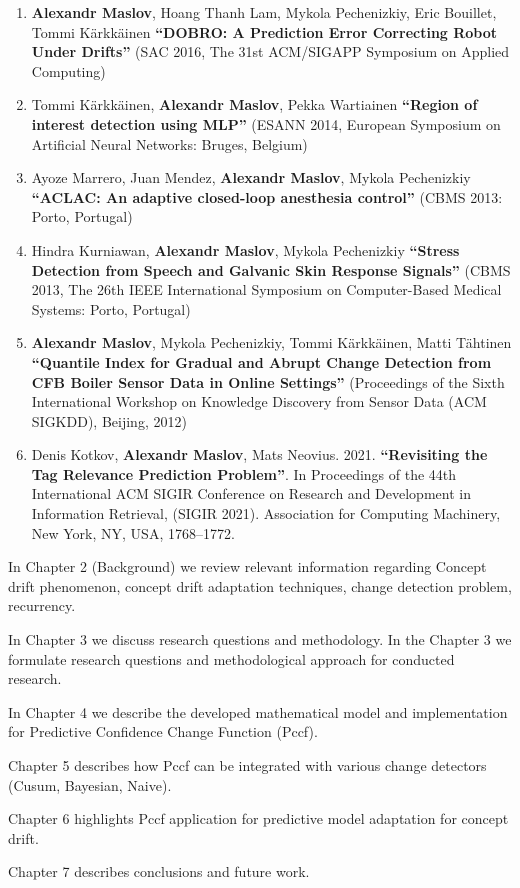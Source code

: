 \begin{enumerate}[leftmargin=0.2cm]
  \item \textbf{Alexandr Maslov}, Hoang Thanh Lam, Mykola Pechenizkiy, Eric Bouillet, Tommi K\"{a}rkk\"{a}inen \textbf{``DOBRO: A Prediction Error Correcting Robot Under Drifts''} (SAC 2016, The 31st ACM/SIGAPP Symposium on Applied Computing)

  \item Tommi K\"{a}rkk\"{a}inen, \textbf{Alexandr Maslov}, Pekka Wartiainen
\textbf{``Region of interest detection using MLP''} (ESANN 2014, European Symposium on Artificial Neural Networks: Bruges, Belgium)

  \item Ayoze Marrero, Juan Mendez, \textbf{Alexandr Maslov}, Mykola Pechenizkiy \textbf{``ACLAC: An adaptive closed-loop anesthesia control''} (CBMS 2013: Porto, Portugal)

  \item Hindra Kurniawan, \textbf{Alexandr Maslov}, Mykola Pechenizkiy \textbf{``Stress Detection from Speech and Galvanic Skin Response Signals''} (CBMS 2013, The 26th IEEE International Symposium on Computer-Based Medical Systems: Porto, Portugal)

  \item \textbf{Alexandr Maslov}, Mykola Pechenizkiy, Tommi K\"{a}rkk\"{a}inen, Matti T\"{a}htinen
\textbf{``Quantile Index for Gradual and Abrupt Change Detection from CFB Boiler Sensor Data in Online Settings''}
(Proceedings of the Sixth International Workshop on Knowledge Discovery from Sensor Data (ACM SIGKDD), Beijing, 2012)

  \item Denis Kotkov, \textbf{Alexandr Maslov}, Mats Neovius. 2021. \textbf{``Revisiting the Tag Relevance Prediction Problem''}. In Proceedings of the 44th International ACM SIGIR Conference on Research and Development in Information Retrieval, (SIGIR 2021). Association for Computing Machinery, New York, NY, USA, 1768–1772. %
\end{enumerate}




In Chapter 2 (Background) we review relevant information regarding Concept drift phenomenon, concept drift adaptation techniques, change detection problem, recurrency.

In Chapter 3 we discuss research questions and methodology.
In the Chapter 3 we formulate research questions and methodological approach for conducted research. 

In Chapter 4 we describe the developed mathematical model and implementation for Predictive Confidence Change Function (Pccf).

Chapter 5 describes how Pccf can be integrated with various change detectors (Cusum, Bayesian, Naive). 

Chapter 6 highlights Pccf application for predictive model adaptation for concept drift. 

Chapter 7 describes conclusions and future work.
